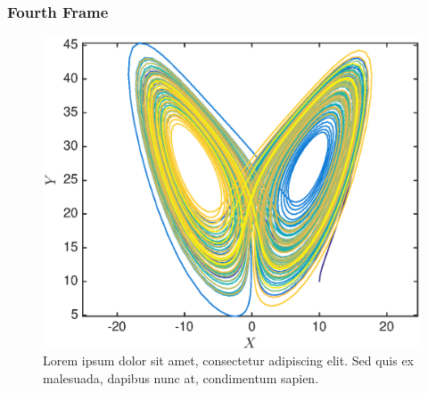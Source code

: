 \documentclass{beamer}
\begin{document}
\begin{frame}
\frametitle{Fourth Frame}
\begin{figure}
\includegraphics[width=\textwidth]{butterfly.eps}
\caption{Lorem ipsum dolor sit amet, consectetur adipiscing elit. Sed quis ex malesuada, dapibus nunc at, condimentum sapien. }
\end{figure}

\end{frame}

\begin{frame}
\end{frame}
\end{document}

